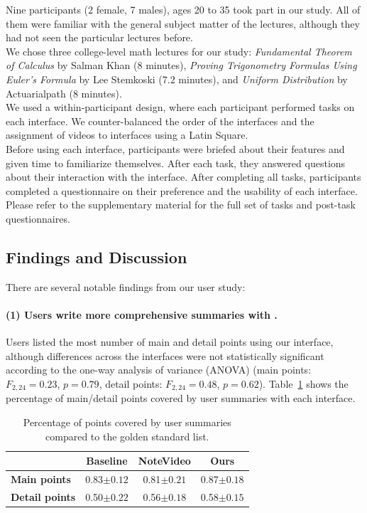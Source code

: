 Nine participants (2 female, 7 males), ages 20 to 35 took part in our study. 
All of them were familiar with the general subject matter of the lectures, although they had not seen the particular lectures before.\\
%
We chose three college-level math lectures for our study: \textit{Fundamental Theorem of Calculus} by Salman Khan (8 minutes), \textit{Proving Trigonometry Formulas Using Euler's Formula} by Lee Stemkoski (7.2 minutes), and \textit{Uniform Distribution} by Actuarialpath (8 minutes).\\
We used a within-participant design, where each participant performed tasks on each interface. We counter-balanced the order of the interfaces and the assignment of videos to interfaces using a Latin Square.\\
Before using each interface, participants were briefed about their features and given time to familiarize themselves. After each task, they answered questions about their interaction with the interface. After completing all tasks, participants completed a questionnaire on their preference and the usability of each interface. Please refer to the supplementary material for the full set of tasks and post-task questionnaires.
\subsection{Findings and Discussion}
There are several notable findings from our user study:

\paragraph{(1) Users write more comprehensive summaries with \systemname .}
Users listed the most number of main and detail points using our interface,
although differences across the interfaces were not statistically significant
according to the one-way analysis of variance (ANOVA) (main points:
$F_{2,24}=0.23$, $p=0.79$, detail points: $F_{2,24}=0.48$, $p=0.62$). Table~\ref{Tab:summary_results} shows the percentage of main/detail
points covered by user summaries with each interface.

\begin{table}[!h]
 \centering
 \begin{tabular}{ l |c c c}
 \hline
    & \textbf{Baseline} & \textbf{NoteVideo} & \textbf{Ours} \\\hline
   \textbf{Main points} & 0.83$\pm0.12$ & 0.81$\pm0.21$ & 0.87$\pm0.18$\\
   \textbf{Detail points} & 0.50$\pm0.22$ & 0.56$\pm0.18$ & 0.58$\pm0.15$\\
   \hline
 \end{tabular}
 \caption{Percentage of points covered by user summaries compared to the
golden standard list.}
 \label{Tab:summary_results}
\end{table}

